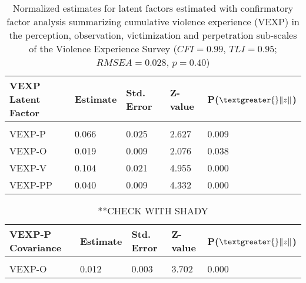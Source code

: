 \documentclass[utf8]{article}
\begin{document}
\begin{table}[]
\begin{tabular}{lllll}
VEXP Latent Factor & Estimate & Std. Error & Z-value & P($\textgreater{}\|z\|$) \\ \hline
                   &          &            &         &                          \\
VEXP-P             & 0.066    & 0.025      & 2.627   & 0.009                    \\
VEXP-O             & 0.019    & 0.009      & 2.076   & 0.038                    \\
VEXP-V             & 0.104    & 0.021      & 4.955   & 0.000                    \\
VEXP-PP            & 0.040    & 0.009      & 4.332   & 0.000                   
\end{tabular}
\caption{Normalized estimates for latent factors estimated with confirmatory factor analysis summarizing cumulative violence experience (VEXP) in the perception, observation, victimization and perpetration sub-scales of the Violence Experience Survey ($CFI = 0.99$, $TLI = 0.95$; $RMSEA = 0.028$, $p = 0.40$)\label{tab:1}}
\end{table} 


\begin{table}[]
\begin{tabular}{lllll}
VEXP-P Covariance & Estimate & Std. Error & Z-value & P($\textgreater{}\|z\|$) \\ \hline
                  &          &            &         &                          \\
VEXP-O            & 0.012    & 0.003      & 3.702   & 0.000                   
\end{tabular}
\caption{**CHECK WITH SHADY\label{tab:2}}
\end{table}
\end{document}
